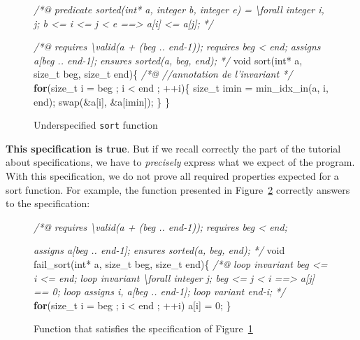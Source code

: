 \documentclass[12pt,francais,]{scrbook}
\newenvironment{Shaded}{}{}
\newcommand{\KeywordTok}[1]{\textcolor[rgb]{0.00,0.44,0.13}{\textbf{{#1}}}}
\newcommand{\DataTypeTok}[1]{\textcolor[rgb]{0.56,0.13,0.00}{{#1}}}
\newcommand{\DecValTok}[1]{\textcolor[rgb]{0.25,0.63,0.44}{{#1}}}
\newcommand{\CommentTok}[1]{\textcolor[rgb]{0.38,0.63,0.69}{\textit{{#1}}}}
\newcommand{\NormalTok}[1]{{#1}}
\begin{document}
\begin{figure}
\begin{footnotesize}\begin{Shaded}
\begin{Highlighting}[]
\CommentTok{/*@}
\CommentTok{  predicate sorted(int* a, integer b, integer e) =}
\CommentTok{    \textbackslash{}forall integer i, j; b <= i <= j < e ==> a[i] <= a[j];}
\CommentTok{*/}

\CommentTok{/*@}
\CommentTok{  requires \textbackslash{}valid(a + (beg .. end-1));}
\CommentTok{  requires beg < end;}
\CommentTok{  assigns  a[beg .. end-1];}
\CommentTok{  ensures sorted(a, beg, end);}
\CommentTok{*/}
\DataTypeTok{void} \NormalTok{sort(}\DataTypeTok{int}\NormalTok{* a, size_t beg, size_t end)\{}
  \CommentTok{/*@ //annotation de l'invariant */}
  \KeywordTok{for}\NormalTok{(size_t i = beg ; i < end ; ++i)\{}
    \NormalTok{size_t imin = min_idx_in(a, i, end);}
    \NormalTok{swap(&a[i], &a[imin]);}
  \NormalTok{\}}
\NormalTok{\}}
\end{Highlighting}
\end{Shaded}\end{footnotesize}
\caption{Underspecified \texttt{sort} function}
\label{fig:6-1-5-insuff}
\end{figure}

\textbf{This specification is true}. But if we recall correctly the part
of the tutorial about specifications, we have to \emph{precisely}
express what we expect of the program. With this specification, we do
not prove all required properties expected for a sort function. For
example, the function presented in Figure~\ref{fig:6-1-5-sort-faux} correctly
answers to the specification:

\begin{figure}
\begin{footnotesize}\begin{Shaded}
\begin{Highlighting}[]
\CommentTok{/*@}
\CommentTok{  requires \textbackslash{}valid(a + (beg .. end-1));}
\CommentTok{  requires beg < end;}

\CommentTok{  assigns  a[beg .. end-1];}
\CommentTok{  }
\CommentTok{  ensures sorted(a, beg, end);}
\CommentTok{*/}
\DataTypeTok{void} \NormalTok{fail_sort(}\DataTypeTok{int}\NormalTok{* a, size_t beg, size_t end)\{}
  \CommentTok{/*@}
\CommentTok{    loop invariant beg <= i <= end;}
\CommentTok{    loop invariant \textbackslash{}forall integer j; beg <= j < i ==> a[j] == 0;}
\CommentTok{    loop assigns i, a[beg .. end-1];}
\CommentTok{    loop variant end-i;}
\CommentTok{  */}
  \KeywordTok{for}\NormalTok{(size_t i = beg ; i < end ; ++i)}
    \NormalTok{a[i] = }\DecValTok{0}\NormalTok{;}
\NormalTok{\}}
\end{Highlighting}
\end{Shaded}\end{footnotesize}
\caption{Function that satisfies the specification of Figure~\ref{fig:6-1-5-insuff}}
\label{fig:6-1-5-sort-faux}
\end{figure}
\end{document}
